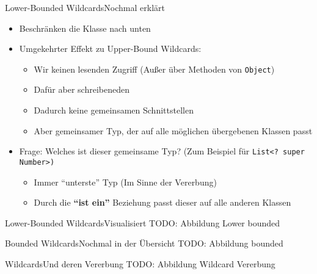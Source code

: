 \begin{frame}{Lower-Bounded Wildcards}{Nochmal erklärt}
    \begin{itemize}[<+->]
        \item Beschränken die Klasse nach unten
        \item Umgekehrter Effekt zu Upper-Bound Wildcards:
        \begin{itemize}
            \item Wir keinen lesenden Zugriff (Außer über Methoden von \texttt{Object})
            \item Dafür aber schreibeneden
            \item Dadurch keine gemeinsamen Schnittstellen
            \item Aber gemeinsamer Typ, der auf alle möglichen übergebenen Klassen passt
        \end{itemize}
        \item Frage: Welches ist dieser gemeinsame Typ? (Zum Beispiel für \texttt{List<? super Number>)}
        \begin{itemize}[<handout:0>]
            \item Immer "`unterste"' Typ (Im Sinne der Vererbung)
            \item Durch die \textbf{"`ist ein"'} Beziehung passt dieser auf alle anderen Klassen
        \end{itemize}
    \end{itemize}
\end{frame}

\begin{frame}{Lower-Bounded Wildcards}{Visualisiert}
TODO: Abbildung Lower bounded
\end{frame}

\begin{frame}{Bounded Wildcards}{Nochmal in der Übersicht}
TODO: Abbildung bounded
\end{frame}

\begin{frame}{Wildcards}{Und deren Vererbung}
TODO: Abbildung Wildcard Vererbung
\end{frame}